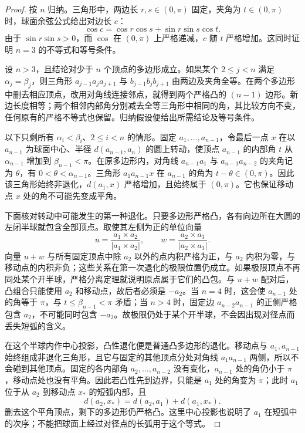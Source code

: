 \begin{proof}
	按 \(n\) 归纳。三角形中，两边长 \(r,s\in(0,\pi)\) 固定，夹角为 \(t\in(0,\pi)\) 时，球面余弦公式给出对边长 \(c\)：
	\[
		\cos c=\cos r\cos s+\sin r\sin s\cos t.
	\]
	由于 \(\sin r\sin s>0\)，而 \(\cos\) 在 \((0,\pi)\) 上严格递减，\(c\) 随 \(t\) 严格增加。这同时证明 \(n=3\) 的不等式和等号条件。

	设 \(n>3\)，且结论对少于 \(n\) 个顶点的多边形成立。如果某个 \(2\le j<n\) 满足 \(\alpha_j=\beta_j\)，则三角形 \(a_{j-1}a_ja_{j+1}\) 与 \(b_{j-1}b_jb_{j+1}\) 由两边及夹角全等。在两个多边形中删去相应顶点，改用对角线连接邻点，就得到两个严格凸的 \((n-1)\) 边形。新边长度相等；两个相邻内部角分别减去全等三角形中相同的角，其比较方向不变，任何原有的严格不等式也保留。归纳假设便给出所需结论及等号条件。

	以下只剩所有 \(\alpha_i<\beta_i\)、\(2\le i<n\) 的情形。固定 \(a_1,\ldots,a_{n-1}\)，令最后一点 \(x\) 在以 \(a_{n-1}\) 为球面中心、半径 \(d(a_{n-1},a_n)\) 的圆上转动，使顶点 \(a_{n-1}\) 的内部角 \(t\) 从 \(\alpha_{n-1}\) 增加到 \(\beta_{n-1}<\pi\)。在原多边形内，对角线 \(a_{n-1}a_1\) 与 \(a_{n-1}a_{n-2}\) 的夹角记为 \(\theta\)，有 \(0<\theta<\alpha_{n-1}\)。三角形 \(a_1a_{n-1}x\) 在 \(a_{n-1}\) 的角为 \(t-\theta\in(0,\pi)\)。因此该三角形始终非退化，\(d(a_1,x)\) 严格增加，且始终属于 \((0,\pi)\)。它也保证移动点 \(x\) 处的角不可能先变成平角。

	下面核对转动中可能发生的第一种退化。只要多边形严格凸，各有向边所在大圆的左闭半球就包含全部顶点。取使其左侧为正的单位向量
	\[
		u=\frac{a_1\times a_2}{|a_1\times a_2|},\qquad
		w=\frac{a_2\times a_3}{|a_2\times a_3|}.
	\]
	向量 \(u+w\) 与所有固定顶点中除 \(a_2\) 以外的点内积严格为正，与 \(a_2\) 内积为零，与移动点的内积非负；这些关系在第一次退化的极限位置仍成立。如果极限顶点不再同处某个开半球，严格分离定理就说明原点属于它们的凸包。与 \(u+w\) 配对后，凸组合只能使用 \(a_2\) 和移动点，故后者必须是 \(-a_2\)。当 \(n=4\) 时，这会使 \(a_{n-1}\) 处的角等于 \(\pi\)，与 \(t\le\beta_{n-1}<\pi\) 矛盾；当 \(n>4\) 时，固定边 \(a_{n-2}a_{n-1}\) 的正侧严格包含 \(a_2\)，不可能同时包含 \(-a_2\)。故极限仍处于某个开半球，不会因出现对径点而丢失短弧的含义。

	在这个半球内作中心投影，凸性退化便是普通凸多边形的退化。移动点与 \(a_1,a_{n-1}\) 始终组成非退化三角形，且它与固定的其他顶点分处对角线 \(a_1a_{n-1}\) 两侧，所以不会碰到其他顶点。固定的各内部角 \(a_2,\ldots,a_{n-2}\) 没有变化，\(a_{n-1}\) 处的角仍小于 \(\pi\)，移动点处也没有平角。因此若凸性先到边界，只能是 \(a_1\) 处的角变为 \(\pi\)；此时 \(a_1\) 位于从 \(a_2\) 到移动点 \(x_*\) 的短弧内部，且
	\begin{equation}\label{g1:eq:spherical-arm-flat-end}
		d(a_2,x_*)=d(a_2,a_1)+d(a_1,x_*).
	\end{equation}
	删去这个平角顶点，剩下的多边形仍严格凸。这里中心投影也说明了 \(a_1\) 在短弧中的次序；不能把球面上经过对径点的长弧用于这个等式。


\end{proof}
